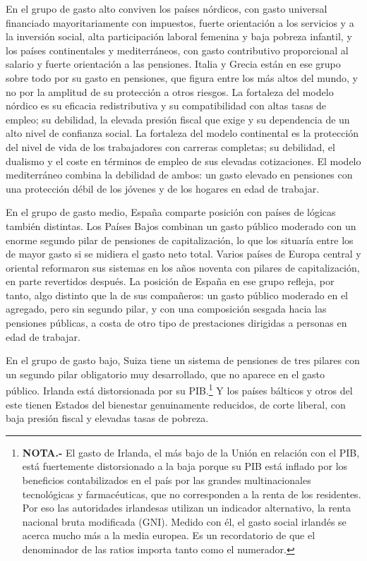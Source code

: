 \documentclass[10pt,a4paper]{article}
\begin{document}
En el grupo de gasto alto conviven los países nórdicos, con gasto universal financiado mayoritariamente con impuestos, fuerte orientación a los servicios y a la inversión social, alta participación laboral femenina y baja pobreza infantil, y los países continentales y mediterráneos, con gasto contributivo proporcional al salario y fuerte orientación a las pensiones. Italia y Grecia están en ese grupo sobre todo por su gasto en pensiones, que figura entre los más altos del mundo, y no por la amplitud de su protección a otros riesgos. La fortaleza del modelo nórdico es su eficacia redistributiva y su compatibilidad con altas tasas de empleo; su debilidad, la elevada presión fiscal que exige y su dependencia de un alto nivel de confianza social. La fortaleza del modelo continental es la protección del nivel de vida de los trabajadores con carreras completas; su debilidad, el dualismo y el coste en términos de empleo de sus elevadas cotizaciones. El modelo mediterráneo combina la debilidad de ambos: un gasto elevado en pensiones con una protección débil de los jóvenes y de los hogares en edad de trabajar.

En el grupo de gasto medio, España comparte posición con países de lógicas también distintas. Los Países Bajos combinan un gasto público moderado con un enorme segundo pilar de pensiones de capitalización, lo que los situaría entre los de mayor gasto si se midiera el gasto neto total. Varios países de Europa central y oriental reformaron sus sistemas en los años noventa con pilares de capitalización, en parte revertidos después. La posición de España en ese grupo refleja, por tanto, algo distinto que la de sus compañeros: un gasto público moderado en el agregado, pero sin segundo pilar, y con una composición sesgada hacia las pensiones públicas, a costa de otro tipo de prestaciones dirigidas a personas en edad de trabajar.

En el grupo de gasto bajo, Suiza tiene un sistema de pensiones de tres pilares con un segundo pilar obligatorio muy desarrollado, que no aparece en el gasto público. Irlanda está distorsionada por su PIB.\footnote{\textbf{NOTA.-} El gasto de Irlanda, el más bajo de la Unión en relación con el PIB, está fuertemente distorsionado a la baja porque su PIB está inflado por los beneficios contabilizados en el país por las grandes multinacionales tecnológicas y farmacéuticas, que no corresponden a la renta de los residentes. Por eso las autoridades irlandesas utilizan un indicador alternativo, la renta nacional bruta modificada (GNI). Medido con él, el gasto social irlandés se acerca mucho más a la media europea. Es un recordatorio de que el denominador de las ratios importa tanto como el numerador.
} Y los países bálticos y otros del este tienen Estados del bienestar genuinamente reducidos, de corte liberal, con baja presión fiscal y elevadas tasas de pobreza.
\end{document}
